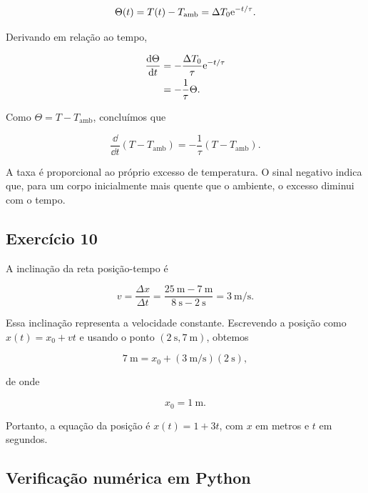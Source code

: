 \begin{equation}
  \Theta(t)=T(t)-T_{\mathrm{amb}}
  =\Delta T_0\mathrm{e}^{-t/\tau}.
\end{equation}

Derivando em relação ao tempo,

\begin{align}
  \frac{\mathop{}\!\mathrm{d}\Theta}{\mathop{}\!\mathrm{d} t}
  &=-\frac{\Delta T_0}{\tau}\mathrm{e}^{-t/\tau}\\
  &=-\frac{1}{\tau}\Theta.
\end{align}

Como \(\Theta=T-T_{\mathrm{amb}}\), concluímos que

\begin{equation}
  \boxed{\frac{\dd}{\dd t}(T-T_{\mathrm{amb}})
  =-\frac{1}{\tau}(T-T_{\mathrm{amb}})}.
\end{equation}

A taxa é proporcional ao próprio excesso de temperatura. O sinal negativo indica que, para um corpo inicialmente mais quente que o ambiente, o excesso diminui com o tempo.

\subsection*{Exercício 10}

A inclinação da reta posição-tempo é

\begin{equation}
  v=\frac{\Delta x}{\Delta t}
  =\frac{\SI{25}{\meter}-\SI{7}{\meter}}
         {\SI{8}{\second}-\SI{2}{\second}}
  =\boxed{\SI{3}{\meter\per\second}}.
\end{equation}

Essa inclinação representa a velocidade constante. Escrevendo a posição como \(x(t)=x_0+vt\) e usando o ponto \((\SI{2}{\second},\SI{7}{\meter})\), obtemos

\begin{equation}
  \SI{7}{\meter}=x_0+
  (\SI{3}{\meter\per\second})(\SI{2}{\second}),
\end{equation}

de onde

\begin{equation}
  \boxed{x_0=\SI{1}{\meter}}.
\end{equation}

Portanto, a equação da posição é \(\boxed{x(t)=1+3t}\), com \(x\) em metros e \(t\) em segundos.

\subsection*{Verificação numérica em Python}

